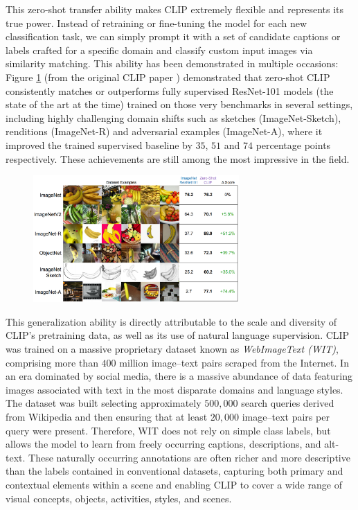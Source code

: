 \documentclass[a4paper, oneside, english]{sapthesis} %
\begin{document}
This zero-shot transfer ability makes CLIP extremely flexible and represents its true power. Instead of retraining or fine-tuning the model for each new classification task, we can simply prompt it with a set of candidate captions or labels crafted for a specific domain and classify custom input images via similarity matching. This ability has been demonstrated in multiple occasions: Figure \ref{fig:clipzs2} (from the original CLIP paper \cite{radford2021learning}) demonstrated that zero-shot CLIP consistently matches or outperforms fully supervised ResNet-101 models (the state of the art at the time) trained on those very benchmarks in several settings, including highly challenging domain shifts such as sketches (ImageNet-Sketch), renditions (ImageNet-R) and adversarial examples (ImageNet-A), where it improved the trained supervised baseline by $35$, $51$ and $74$ percentage points respectively. These achievements are still among the most impressive in the field.

\begin{figure}[h]
    \centering
    \includegraphics[width=0.7\textwidth]{img/CLIP_zero_shot.png}
    \caption{}
    \label{fig:clipzs2}
\end{figure}

This generalization ability is directly attributable to the scale and diversity of CLIP's pretraining data, as well as its use of natural language supervision. CLIP was trained on a massive proprietary dataset known as \emph{WebImageText (WIT)}, comprising more than $400$ million image–text pairs scraped from the Internet. In an era dominated by social media, there is a massive abundance of data featuring images associated with text in the most disparate domains and language styles. The dataset was built selecting approximately $500,000$ search queries derived from Wikipedia and then ensuring that at least $20,000$ image–text pairs per query were present. Therefore, WIT does not rely on simple class labels, but allows the model to learn from freely occurring captions, descriptions, and alt-text. These naturally occurring annotations are often richer and more descriptive than the labels contained in conventional datasets, capturing both primary and contextual elements within a scene and enabling CLIP to cover a wide range of visual concepts, objects, activities, styles, and scenes.
\end{document}
